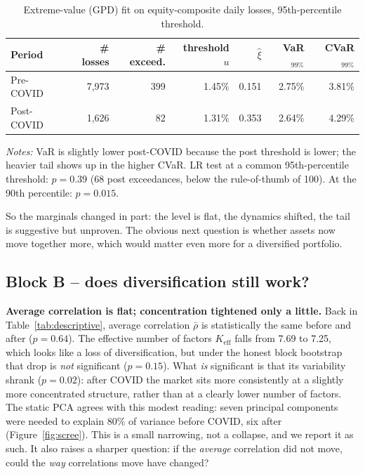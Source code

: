 \documentclass[11pt,a4paper]{article}
\newcommand{\rhobar}{\bar{\rho}}
\newcommand{\Keff}{K_{\text{eff}}}
\begin{document}
\begin{table}[H]
\centering
\caption{Extreme-value (GPD) fit on equity-composite daily losses, 95th-percentile threshold.}
\label{tab:gpd}
\small
\begin{tabular}{lrrrrrr}
\toprule
Period & \# losses & \# exceed. & threshold $u$ & $\hat\xi$ & VaR$_{99\%}$ & CVaR$_{99\%}$ \\
\midrule
Pre-COVID  & 7{,}973 & 399 & 1.45\% & 0.151 & 2.75\% & 3.81\% \\
Post-COVID & 1{,}626 & ~82 & 1.31\% & 0.353 & 2.64\% & 4.29\% \\
\bottomrule
\end{tabular}
\begin{flushleft}
\footnotesize
\textit{Notes:} VaR is slightly lower post-COVID because the post threshold is lower; the heavier tail
shows up in the higher CVaR. LR test at a common 95th-percentile threshold: $p=0.39$ (68 post
exceedances, below the rule-of-thumb of 100). At the 90th percentile: $p=0.015$.
\end{flushleft}
\end{table}

So the marginals changed in part: the level is flat, the dynamics shifted, the tail is suggestive but
unproven. The obvious next question is whether assets now move together more, which would matter even more
for a diversified portfolio.

\subsection{Block B -- does diversification still work?}

\textbf{Average correlation is flat; concentration tightened only a little.} Back in
Table~\ref{tab:descriptive}, average correlation $\rhobar$ is statistically the same before and after
($p=0.64$). The effective number of factors $\Keff$ falls from 7.69 to 7.25, which looks like a loss of
diversification, but under the honest block bootstrap that drop is \emph{not} significant ($p=0.15$).
What \emph{is} significant is that its variability shrank ($p=0.02$): after COVID the market sits more
consistently at a slightly more concentrated structure, rather than at a clearly lower number of factors.
The static PCA agrees with this modest reading: seven principal components were needed to explain 80\% of
variance before COVID, six after (Figure~\ref{fig:scree}). This is a small narrowing, not a collapse, and
we report it as such. It also raises a sharper question: if the \emph{average} correlation did not move,
could the \emph{way} correlations move have changed?
\end{document}
